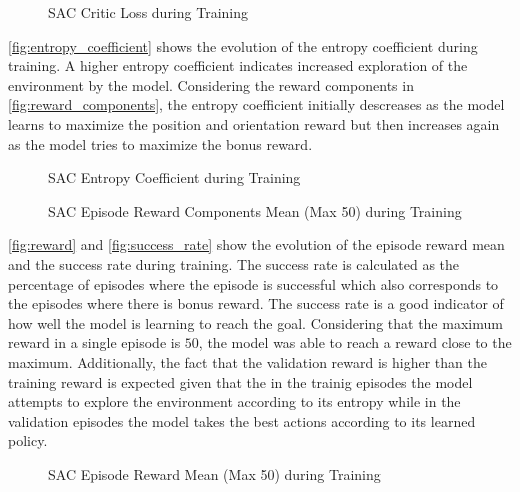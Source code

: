 \begin{figure}[H]%
    \centering
    {\fontsize{8}{11}\selectfont}
    \caption{SAC Critic Loss during Training}
    \label{fig:critic_loss}
\end{figure}

\autoref{fig:entropy_coefficient} shows the evolution of the entropy coefficient during training. A higher entropy coefficient indicates increased exploration of the environment by the model. Considering the reward components in \autoref{fig:reward_components}, the entropy coefficient initially descreases as the model learns to maximize the position and orientation reward but then increases again as the model tries to maximize the bonus reward. 

\begin{figure}[H]%
    \centering
    {\fontsize{8}{11}\selectfont}
    \caption{SAC Entropy Coefficient during Training}
    \label{fig:entropy_coefficient}
\end{figure}

\begin{figure}[H]%
    \centering
    {\fontsize{8}{11}\selectfont}
    \caption{SAC Episode Reward Components Mean (Max 50) during Training}
    \label{fig:reward_components}
\end{figure}

\autoref{fig:reward} and \autoref{fig:success_rate} show the evolution of the episode reward mean and the success rate during training. The success rate is calculated as the percentage of episodes where the episode is successful which also corresponds to the episodes where there is bonus reward. The success rate is a good indicator of how well the model is learning to reach the goal. Considering that the maximum reward in a single episode is $50$, the model was able to reach a reward close to the maximum. Additionally, the fact that the validation reward is higher than the training reward is expected given that the in the trainig episodes the model attempts to explore the environment according to its entropy while in the validation episodes the model takes the best actions according to its learned policy.

\begin{figure}[H]%
    \centering
    {\fontsize{8}{11}\selectfont}
    \caption{SAC Episode Reward Mean (Max 50) during Training}
    \label{fig:reward}
\end{figure}

